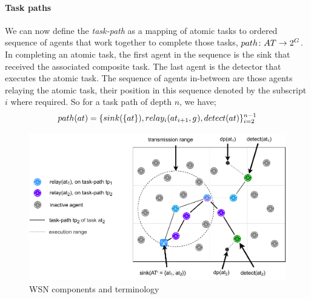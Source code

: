 
\paragraph{Task paths}
We can now define the \textit{task-path} as a mapping of atomic tasks to ordered sequence of agents that work together to complete those tasks, $\formalTaskArc{}{}$. In completing an atomic task, the first agent in the sequence is the sink that received the associated composite task. The last agent is the detector that executes the atomic task. The sequence of agents in-between are those agents relaying the atomic task, their position in this sequence denoted by the subscript $i$ where required. So for a task path of depth $n$, we have;
\begin{equation}
	\functionTaskArc{}{} = \lbrace \functionSinkRoleAtomic{}{}, \functionRelayRole{i}{i+1}{}, \functionDetectorRole{}{} \rbrace_{i=2}^{n-1}
\end{equation}
\begin{figure}
	\centering 
	\includegraphics[width=0.9\linewidth, trim={25pt 0pt 24pt 0pt, clip}]{grid_concept}
	\caption[WSN deployment terminology]{WSN components and terminology}
	\label{fig:grid_concept}
\end{figure}
